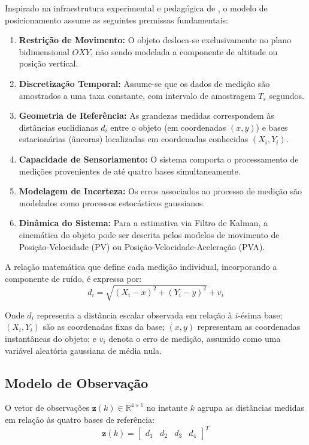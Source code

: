 \documentclass[journal]{IEEEtran}
\begin{document}
Inspirado na infraestrutura experimental e pedagógica de \cite{falek2020}, o modelo de posicionamento assume as seguintes premissas fundamentais:
\begin{enumerate}
    \item \textbf{Restrição de Movimento:} O objeto desloca-se exclusivamente no plano bidimensional $OXY$, não sendo modelada a componente de altitude ou posição vertical.
    \item \textbf{Discretização Temporal:} Assume-se que os dados de medição são amostrados a uma taxa constante, com intervalo de amostragem $T_s$ segundos.
    \item \textbf{Geometria de Referência:} As grandezas medidas correspondem às distâncias euclidianas $d_i$ entre o objeto (em coordenadas $(x, y)$) e bases estacionárias (âncoras) localizadas em coordenadas conhecidas $(X_i, Y_i)$.
    \item \textbf{Capacidade de Sensoriamento:} O sistema comporta o processamento de medições provenientes de até quatro bases simultaneamente.
    \item \textbf{Modelagem de Incerteza:} Os erros associados ao processo de medição são modelados como processos estocásticos gaussianos.
    \item \textbf{Dinâmica do Sistema:} Para a estimativa via Filtro de Kalman, a cinemática do objeto pode ser descrita pelos modelos de movimento de Posição-Velocidade (PV) ou Posição-Velocidade-Aceleração (PVA).
\end{enumerate}
    
A relação matemática que define cada medição individual, incorporando a componente de ruído, é expressa por:
\begin{equation}
\label{eq:dist_base}
 d_i = \sqrt{(X_i-x)^2+(Y_i-y)^2} + v_i 
\end{equation}

Onde $d_i$ representa a distância escalar observada em relação à $i$-ésima base; $(X_i, Y_i)$ são as coordenadas fixas da base; $(x, y)$ representam as coordenadas instantâneas do objeto; e $v_i$ denota o erro de medição, assumido como uma variável aleatória gaussiana de média nula.

\subsection{Modelo de Observação}

O vetor de observações $\mathbf{z}(k) \in \mathbb{R}^{4\times 1}$ no instante $k$ agrupa as distâncias medidas em relação às quatro bases de referência:
\begin{equation}
    \label{eq:modelZ}
    \mathbf{z}(k) = \begin{bmatrix}
        d_1 & d_2 & d_3 & d_4
    \end{bmatrix}^T
\end{equation}
\end{document}
